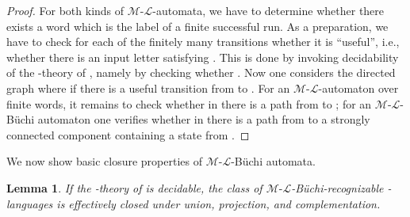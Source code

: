 \documentclass[copyright,creativecommons]{eptcs}
\newtheorem{lemma}[theorem]{Lemma}
\theoremstyle{plain}
\theoremstyle{nonumberplain}
\newtheorem{proof}{Proof}
\newcommand{\m}{\ensuremath{\mathcal{M}}}
\newcommand{\el}{\ensuremath{\mathcal{L}}}
\newcommand{\ml}{\ensuremath{\m\textrm{-}\el}}
\begin{document}
\begin{proof}
For both kinds of \ml-automata, we have to determine whether there exists 
a word which is the label of a finite successful run. As a preparation, 
we have to check for each of the finitely many transitions  
whether it is ``useful'', i.e., whether 
there is an input letter  satisfying 
. This is done by invoking decidability of the -theory of , 
namely by checking whether . 
Now one considers the directed graph  where  if there is a useful
transition from  to . For an \ml-automaton over finite words, it remains to check whether 
in  there is a path from  to ; for an \ml-B\"uchi automaton one verifies whether
in  there is a path from  to a strongly connected component containing a state from .
\end{proof}

We now show basic closure properties of \ml-B\"uchi automata.


\begin{lemma}\label{lem:mlbuechiclosure}
If the -theory of  is decidable, 
the class of \ml-B{\"u}chi-recognizable -languages is effectively closed 
under union, projection, and complementation.
\end{lemma}
\end{document}
